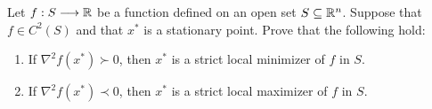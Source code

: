 \documentclass{ExerciseSheet}
\newif\ifsolutions
\begin{document}
\ifsolutions
\vskip 0.3cm
\begin{solution}.
\begin{enumerate}
    \item For any $x\in\R^m$, it holds that $x^TAx = x^TBB^Tx=(B^Tx)^T(B^Tx)=\lVert B^Tx\rVert^2\geq 0$. Hence $A\succcurlyeq 0$.

    \item 
    Suppose that $A$ is positive definite. Then, for any nonzero $x\in\R^m$, it holds that 
    \begin{align*}
        0<x^TAx= x^TBB^Tx=\lVert B^Tx\rVert^2
    \end{align*}
    which implies that $\text{ker}(B^T)=\{0\}$. Then, $B^T$ is injective and thus $\text{rank}(B^T)=m$. Since transpose dose not change rank, it holds $\text{rank}(B)=m$.

    Now, suppose $B$ has a full row-rank, i.e., $B^T$ is injective. Therefore $\text{ker}(B^T)=\{0\}$. For any non‑zero $x\in\mathbb R^{m}$ one therefore has $B^Tx\neq 0$, thus, $x^TAx=\lVert B^Tx\rVert^2>0$.
\end{enumerate}
\end{solution}
\fi
\vskip 0.5cm
\begin{problem}
Let $f: S \longrightarrow \mathbb{R}$ be a function defined on an open set $S\subseteq \mathbb{R}^n$. Suppose that $f \in C^2(S)$ and that $x^*$ is a stationary point. Prove that the following hold:
\begin{enumerate}
    \item If $\nabla^2 f(x^*) \succ 0$, then $x^*$ is a strict local minimizer of $f$ in $S$.
    \item  If $\nabla^2 f(x^*) \prec 0$, then $x^*$ is a strict local maximizer of $f$ in $S$.
\end{enumerate}
\end{problem}
\end{document}
